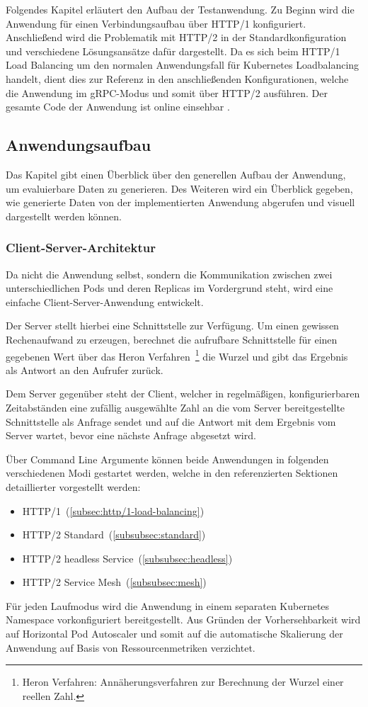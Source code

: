 Folgendes Kapitel erläutert den Aufbau der Testanwendung.
Zu Beginn wird die Anwendung für einen Verbindungsaufbau über HTTP/1 konfiguriert.
Anschließend wird die Problematik mit HTTP/2 in der Standardkonfiguration und verschiedene Lösungsansätze dafür dargestellt.
Da es sich beim HTTP/1 Load Balancing um den normalen Anwendungsfall für Kubernetes Loadbalancing handelt, dient dies zur Referenz in den anschließenden Konfigurationen, welche die Anwendung im gRPC-Modus und somit über HTTP/2 ausführen.
Der gesamte Code der Anwendung ist online einsehbar \cite{github}.

\subsection{Anwendungsaufbau}\label{subsec:anwendungsaufbau}
Das Kapitel gibt einen Überblick über den generellen Aufbau der Anwendung, um evaluierbare Daten zu generieren.
Des Weiteren wird ein Überblick gegeben, wie generierte Daten von der implementierten Anwendung abgerufen und visuell dargestellt werden können.

\subsubsection{Client-Server-Architektur}
Da nicht die Anwendung selbst, sondern die Kommunikation zwischen zwei unterschiedlichen Pods und deren Replicas im Vordergrund steht, wird eine einfache Client-Server-Anwendung entwickelt.

Der Server stellt hierbei eine Schnittstelle zur Verfügung.
Um einen gewissen Rechenaufwand zu erzeugen, berechnet die aufrufbare Schnittstelle für einen gegebenen Wert über das Heron Verfahren~\footnote{Heron Verfahren: Annäherungsverfahren zur Berechnung der Wurzel einer reellen Zahl.} die Wurzel und gibt das Ergebnis als Antwort an den Aufrufer zurück.

Dem Server gegenüber steht der Client, welcher in regelmäßigen, konfigurierbaren Zeit\-ab\-stän\-den eine zufällig ausgewählte Zahl an die vom Server bereitgestellte Schnittstelle als Anfrage sendet und auf die Antwort mit dem Ergebnis vom Server wartet, bevor eine nächste Anfrage abgesetzt wird.

Über Command Line Argumente können beide Anwendungen in folgenden verschiedenen Modi gestartet werden, welche in den referenzierten Sektionen detaillierter vorgestellt werden:
\begin{itemize}
    \item HTTP/1~(\ref{subsec:http/1-load-balancing})
    \item HTTP/2 Standard~(\ref{subsubsec:standard})
    \item HTTP/2 headless Service~(\ref{subsubsec:headless})
    \item HTTP/2 Service Mesh~(\ref{subsubsec:mesh})
\end{itemize}
Für jeden Laufmodus wird die Anwendung in einem separaten Kubernetes Namespace vorkonfiguriert bereitgestellt.
Aus Gründen der Vorhersehbarkeit wird auf Horizontal Pod Autoscaler und somit auf die automatische Skalierung der Anwendung auf Basis von Ressourcenmetriken verzichtet.

